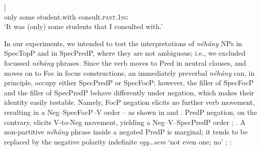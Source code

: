 \documentclass[output=paper]{langscibook}
\begin{document}
\ea
\gll [$_\text{FocP}$ \minsp{(} Csak) \minsp{ʹ} \textsc{néhány} \textsc{diákkal} konzultáltam$_\text{i}$ [$_\text{PredP}$  \textit{t}$_\text{i}$ \dots]]\\
{} {} only {} some student.with consult.\textsc{past}.\textsc{1sg} \\ 
\glt `It was (only) some students that I consulted with.' \label{kis-zet:csak néhány diákkal}
\z

\eal
{}
\zl

\noindent In our experiments, we intended to test the interpretations of \textit{néhány} NPs in SpecTopP and in SpecPredP, where they are not ambiguous; i.e., we excluded focussed \textit{néhány} phrases. Since the verb moves to Pred in neutral clauses, and moves on to Foc in focus constructions, an immediately preverbal \textit{néhány} can, in principle, occupy either SpecPredP or SpecFocP; however, the filler of SpecFocP and the filler of SpecPredP behave differently under negation, which makes their identity easily testable. Namely, FocP negation elicits no further verb movement, resulting in a Neg–SpecFocP–V order – as shown in  and . PredP negation, on the contrary, elicits V-to-Neg movement, yielding a Neg–V–SpecPredP order ; . A non-partitive \textit{néhány} phrase inside a negated PredP is marginal; it tends to be replaced by the negative polarity indefinite \textit{egy\dots sem} `not even one; no' ; : 
\end{document}
